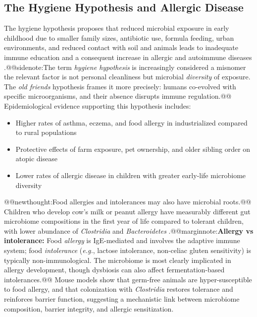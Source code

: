 \documentclass{tufte-handout}
\makeatletter
\def\newthought#1{@@newthought:#1@@}
\def\marginnote#1{@@marginnote:#1@@}
\def\sidenote#1{@@sidenote:#1@@}
\makeatother
\begin{document}
\subsection{The Hygiene Hypothesis and Allergic Disease}

The hygiene hypothesis proposes that reduced microbial exposure in early childhood due to smaller family sizes, antibiotic use, formula feeding, urban environments, and reduced contact with soil and animals leads to inadequate immune education and a consequent increase in allergic and autoimmune diseases \citep{strachanHayFeverHygiene1989}.\sidenote{The term \emph{hygiene hypothesis} is increasingly considered a misnomer the relevant factor is not personal cleanliness but microbial \textit{diversity} of exposure. The \emph{old friends} hypothesis frames it more precisely: humans co-evolved with specific microorganisms, and their absence disrupts immune regulation.} Epidemiological evidence supporting this hypothesis includes:

\begin{itemize}
  \item Higher rates of asthma, eczema, and food allergy in industrialized compared to rural populations
  \item Protective effects of farm exposure, pet ownership, and older sibling order on atopic disease
  \item Lower rates of allergic disease in children with greater early-life microbiome diversity
\end{itemize}

\newthought{Food allergies and intolerances may also have microbial roots.} Children who develop cow's milk or peanut allergy have measurably different gut microbiome compositions in the first year of life compared to tolerant children, with lower abundance of \textit{Clostridia} and \textit{Bacteroidetes} \citep{cahenzliIntestinalMicrobialDiversity2013}.\marginnote{\textbf{Allergy vs intolerance:} Food \textit{allergy} is IgE-mediated and involves the adaptive immune system; food \textit{intolerance} (\textit{e.g.}, lactose intolerance, non-celiac gluten sensitivity) is typically non-immunological. The microbiome is most clearly implicated in allergy development, though dysbiosis can also affect fermentation-based intolerances.} Mouse models show that germ-free animals are hyper-susceptible to food allergy, and that colonization with \textit{Clostridia} restores tolerance and reinforces barrier function, suggesting a mechanistic link between microbiome composition, barrier integrity, and allergic sensitization.
\end{document}
